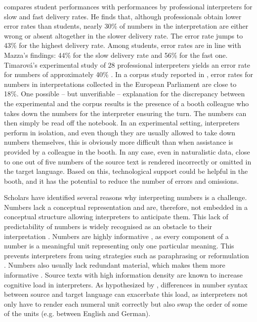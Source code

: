 \documentclass[output=paper]{langsci/langscibook}
\begin{document}
\citet{Korpal2016} compares student performances with performances by professional interpreters for slow and fast delivery rates. He finds that, although professionals obtain lower error rates than students, nearly 30\% of numbers in the interpretation are either wrong or absent altogether in the slower delivery rate. The error rate jumps to 43\% for the highest delivery rate. Among students, error rates are in line with Mazza’s findings: 44\% for the slow delivery rate and 56\% for the fast one. Timarová’s experimental study of 28 professional interpreters yields an error rate for numbers of approximately 40\% \citep{Timarova2012}. In a corpus study reported in \citet{Collard2017}, error rates for numbers in interpretations collected in the European Parliament are close to 18\%. One possible – but unverifiable – explanation for the discrepancy between the experimental and the corpus results is the presence of a booth colleague who takes down the numbers for the interpreter ensuring the turn. The numbers can then simply be read off the notebook. In an experimental setting, interpreters perform in isolation, and even though they are usually allowed to take down numbers themselves, this is obviously more difficult than when assistance is provided by a colleague in the booth. In any case, even in naturalistic data, close to one out of five numbers of the source text is rendered incorrectly or omitted in the target language. Based on this, technological support could be helpful in the booth, and it has the potential to reduce the number of errors and omissions.

Scholars have identified several reasons why interpreting numbers is a challenge. Numbers lack a conceptual representation \citep{Timarova2012,Seeber2015} and are, therefore, not embedded in a conceptual structure allowing interpreters to anticipate them. This lack of predictability of numbers is widely recognised as an obstacle to their interpretation \citep{Braun1996,Mazza2001,Pinochi2009,Mead2015}. Numbers are highly informative \citep{Alessandrini1990}, as every component of a number is a meaningful unit representing only one particular meaning. This prevents interpreters from using strategies such as paraphrasing or reformulation \citep{Pinochi2009}. Numbers also usually lack redundant material, which makes them more informative \citep{Gile1995,Seeber2015}. Source texts with high information density are known to increase cognitive load in interpreters. As hypothesized by \citet{Pinochi2009}, differences in number syntax between source and target language can exacerbate this load, as interpreters not only have to render each numeral unit correctly but also swap the order of some of the units (e.g. between English and German).
\end{document}

